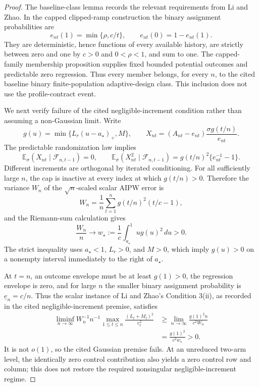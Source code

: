 \documentclass{article}
\begin{document}
\begin{proof}
The baseline-class lemma records the relevant requirements from Li and Zhao.  In the capped clipped-ramp construction the binary assignment probabilities are
\[
 e_{nt}(1)=\min\{\rho,c/t\},
 \qquad
 e_{nt}(0)=1-e_{nt}(1).
\]
They are deterministic, hence functions of every available history, are strictly between zero and one by \(c>0\) and \(0<\rho<1\), and sum to one.  The capped-family membership proposition supplies fixed bounded potential outcomes and predictable zero regression.  Thus every member belongs, for every \(n\), to the cited baseline binary finite-population adaptive-design class.  This inclusion does not use the profile-contract event.

We next verify failure of the cited negligible-increment condition rather than assuming a non-Gaussian limit.  Write
\[
 g(u)=\min\{L_r(u-a_\star)_+,M\},
 \qquad
 X_{nt}=(A_{nt}-e_{nt})\frac{\sigma g(t/n)}{e_{nt}}.
\]
The predictable randomization law implies
\[
 \mathbb E_\sigma(X_{nt}\mid\mathcal F_{n,t-1})=0,
 \qquad
 \mathbb E_\sigma(X_{nt}^2\mid\mathcal F_{n,t-1})
 =g(t/n)^2\{e_{nt}^{-1}-1\}.
\]
Different increments are orthogonal by iterated conditioning.  For all sufficiently large \(n\), the cap is inactive at every index at which \(g(t/n)>0\).  Therefore the variance \(W_n\) of the \(\sqrt n\)-scaled scalar AIPW error is
\[
 W_n=\frac1n\sum_{t=1}^n g(t/n)^2(t/c-1),
\]
and the Riemann-sum calculation gives
\[
 \frac{W_n}{n}\longrightarrow
 w_\star:=\frac1c\int_{a_\star}^1u g(u)^2\,du>0.
\]
The strict inequality uses \(a_\star<1\), \(L_r>0\), and \(M>0\), which imply \(g(u)>0\) on a nonempty interval immediately to the right of \(a_\star\).

At \(t=n\), an outcome envelope must be at least \(g(1)>0\), the regression envelope is zero, and for large \(n\) the smaller binary assignment probability is \(\underline e_n=c/n\).  Thus the scalar instance of Li and Zhao's Condition 3(ii), as recorded in the cited negligible-increment premise, satisfies
\[
\begin{aligned}
 \liminf_{n\to\infty}
 W_n^{-1}n^{-1}
 \max_{1\le t\le n}\frac{(L_t+M_t)^2}{\underline e_t^2}
 &\ge
 \lim_{n\to\infty}
 \frac{g(1)^2n}{c^2W_n}\\
 &=\frac{g(1)^2}{c^2w_\star}>0.
\end{aligned}
\]
It is not \(o(1)\), so the cited Gaussian premise fails.  At an unreduced two-arm level, the identically zero control contribution also yields a zero control row and column; this does not restore the required nonsingular negligible-increment regime.


\end{proof}
\end{document}
